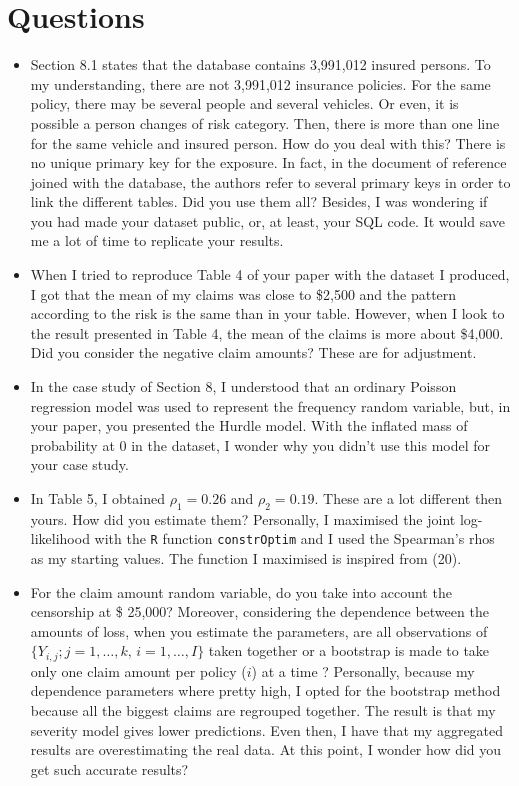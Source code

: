 \documentclass[11pt,letterpaper]{article}
\author{Alexandre Lepage}
\begin{document}
	
	\section{Questions}
	\begin{itemize}
		\item Section 8.1 states that the database contains 3,991,012 insured persons. To my understanding, there are not 3,991,012 insurance policies. For the same policy, there may be several people and several vehicles. Or even, it is possible a person changes of risk category. Then, there is more than one line for the same vehicle and insured person. How do you deal with this? There is no unique primary key for the exposure. In fact, in the document of reference joined with the database, the authors refer to several primary keys in order to link the different tables. Did you use them all? Besides, I was wondering if you had made your dataset public, or, at least, your SQL code. It would save me a lot of time to replicate your results.
					
		\item When I tried to reproduce Table 4 of your paper with the dataset I produced, I got that the mean of my claims was close to \$2,500 and the pattern according to the risk is the same than in your table. However, when I look to the result presented in Table 4, the mean of the claims is more about \$4,000. Did you consider the negative claim amounts? These are for adjustment.	
		
		\item In the case study of Section 8, I understood that an ordinary Poisson regression model was used to represent the frequency random variable, but, in your paper, you presented the Hurdle model. With the inflated mass of probability at 0 in the dataset, I wonder why you didn’t use this model for your case study.
		
		\item In Table 5, I obtained $\rho_1 = 0.26$ and $\rho_2 = 0.19$. These are a lot different then yours. How did you estimate them? Personally, I maximised the joint log-likelihood with the \texttt{R} function \texttt{constrOptim} and I used the Spearman's rhos as my starting values. The function I maximised is inspired from (20).
		
		\item For the claim amount random variable, do you take into account the censorship at \$ 25,000? Moreover, considering the dependence between the amounts of loss, when you estimate the parameters, are all observations of $ \{ Y_{i, j}; j = 1, \dots, k, \, i = 1, \dots, I \} $ taken together or a bootstrap is made to take only one claim amount per policy ($ i $) at a time ?	Personally, because my dependence parameters where pretty high, I opted for the bootstrap method because all the biggest claims are regrouped together. The result is that my severity model gives lower predictions. Even then, I have that my aggregated results are overestimating the real data. At this point, I wonder how did you get such accurate results?
			
	\end{itemize}
\end{document}

